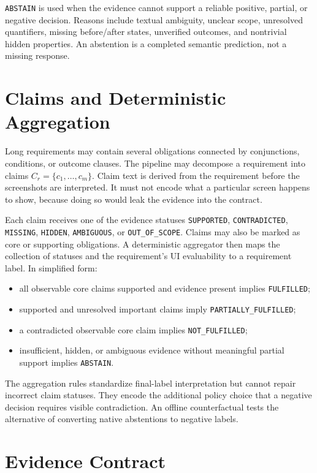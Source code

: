 \texttt{ABSTAIN} is used when the evidence cannot support a reliable positive, partial,
or negative decision. Reasons include textual ambiguity, unclear scope,
unresolved quantifiers, missing before/after states, unverified outcomes, and
nontrivial hidden properties. An abstention is a completed semantic prediction,
not a missing response.

\section{Claims and Deterministic Aggregation}\label{claims-and-deterministic-aggregation}

Long requirements may contain several obligations connected by conjunctions,
conditions, or outcome clauses. The pipeline may decompose a requirement into
claims \(C_r = \{c_1,\ldots,c_m\}\). Claim text is derived from the requirement
before the screenshots are interpreted. It must not encode what a particular
screen happens to show, because doing so would leak the evidence into the
contract.

Each claim receives one of the evidence statuses \texttt{SUPPORTED},
\texttt{CONTRADICTED}, \texttt{MISSING}, \texttt{HIDDEN}, \texttt{AMBIGUOUS}, or \texttt{OUT\_OF\_SCOPE}. Claims may
also be marked as core or supporting obligations. A deterministic aggregator
then maps the collection of statuses and the requirement's UI evaluability to a
requirement label. In simplified form:

\begin{itemize}
\tightlist
\item
  all observable core claims supported and evidence present implies
  \texttt{FULFILLED};
\item
  supported and unresolved important claims imply \texttt{PARTIALLY\_\allowbreak FULFILLED};
\item
  a contradicted observable core claim implies \texttt{NOT\_FULFILLED};
\item
  insufficient, hidden, or ambiguous evidence without meaningful partial
  support implies \texttt{ABSTAIN}.
\end{itemize}

The aggregation rules standardize final-label interpretation but cannot repair
incorrect claim statuses. They encode the additional policy choice that a
negative decision requires visible contradiction. An offline counterfactual
tests the alternative of converting native abstentions to negative labels.

\section{Evidence Contract}\label{evidence-contract}

